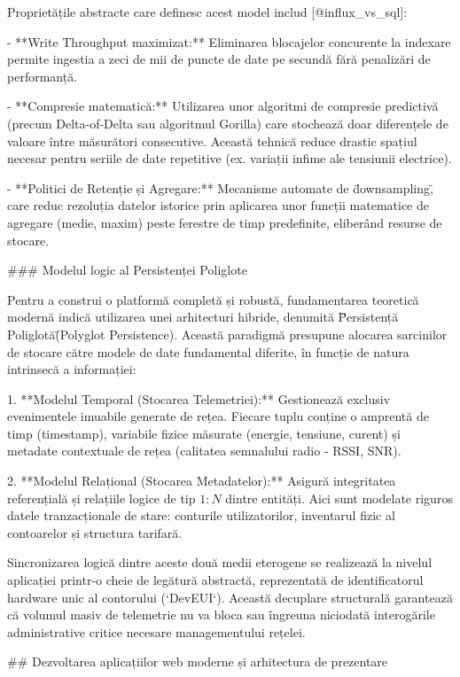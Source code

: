 Proprietățile abstracte care definesc acest model includ
[@influx_vs_sql]:

- **Write Throughput maximizat:** Eliminarea blocajelor concurente la
  indexare permite ingestia a zeci de mii de puncte de date pe secundă
  fără penalizări de performanță.

- **Compresie matematică:** Utilizarea unor algoritmi de compresie
  predictivă (precum Delta-of-Delta sau algoritmul Gorilla) care
  stochează doar diferențele de valoare între măsurători consecutive.
  Această tehnică reduce drastic spațiul necesar pentru seriile de date
  repetitive (ex. variații infime ale tensiunii electrice).

- **Politici de Retenție și Agregare:** Mecanisme automate de
  \"downsampling\", care reduc rezoluția datelor istorice prin aplicarea
  unor funcții matematice de agregare (medie, maxim) peste ferestre de
  timp predefinite, eliberând resurse de stocare.

### Modelul logic al Persistenței Poliglote

Pentru a construi o platformă completă și robustă, fundamentarea
teoretică modernă indică utilizarea unei arhitecturi hibride, denumită
\"Persistență Poliglotă\" (Polyglot Persistence). Această paradigmă
presupune alocarea sarcinilor de stocare către modele de date
fundamental diferite, în funcție de natura intrinsecă a informației:

1.  **Modelul Temporal (Stocarea Telemetriei):** Gestionează exclusiv
    evenimentele imuabile generate de rețea. Fiecare tuplu conține o
    amprentă de timp (timestamp), variabile fizice măsurate (energie,
    tensiune, curent) și metadate contextuale de rețea (calitatea
    semnalului radio - RSSI, SNR).

2.  **Modelul Relațional (Stocarea Metadatelor):** Asigură integritatea
    referențială și relațiile logice de tip $1:N$ dintre entități. Aici
    sunt modelate riguros datele tranzacționale de stare: conturile
    utilizatorilor, inventarul fizic al contoarelor și structura
    tarifară.

Sincronizarea logică dintre aceste două medii eterogene se realizează la
nivelul aplicației printr-o cheie de legătură abstractă, reprezentată de
identificatorul hardware unic al contorului (`DevEUI`). Această
decuplare structurală garantează că volumul masiv de telemetrie nu va
bloca sau îngreuna niciodată interogările administrative critice
necesare managementului rețelei.

## Dezvoltarea aplicațiilor web moderne și arhitectura de prezentare


